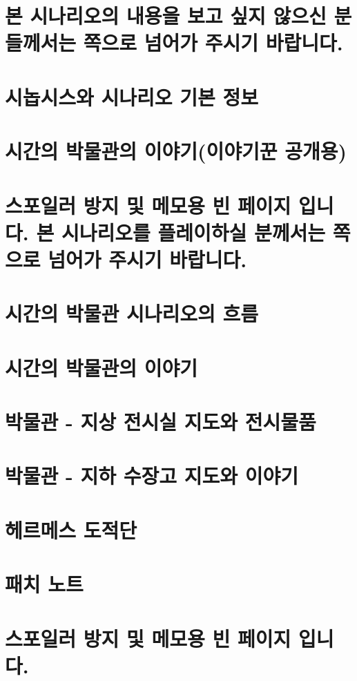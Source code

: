 \documentclass{report}
\begin{document}
	\chapter*{본 시나리오의 내용을 보고 싶지 않으신 분들께서는 \pageref{endof_MoT}쪽으로 넘어가 주시기 바랍니다.}
	
	\chapter{시놉시스와 시나리오 기본 정보}
		
	
	\chapter{시간의 박물관의 이야기(이야기꾼 공개용)}
		
	
	\chapter*{스포일러 방지 및 메모용 빈 페이지 입니다. 본 시나리오를 플레이하실 분께서는 \pageref{endof_MoT}쪽으로 넘어가 주시기 바랍니다.}
	
	\parttoc
	
	\chapter{시간의 박물관 시나리오의 흐름}
		
	
	\chapter{시간의 박물관의 이야기}
		
	
	\chapter{박물관 - 지상 전시실 지도와 전시물품}
		
	
	\chapter{박물관 - 지하 수장고 지도와 이야기}
		
	
	\chapter{헤르메스 도적단}
		
		
	\chapter{패치 노트}
		
	
	\chapter*{스포일러 방지 및 메모용 빈 페이지 입니다.}
\end{document}
